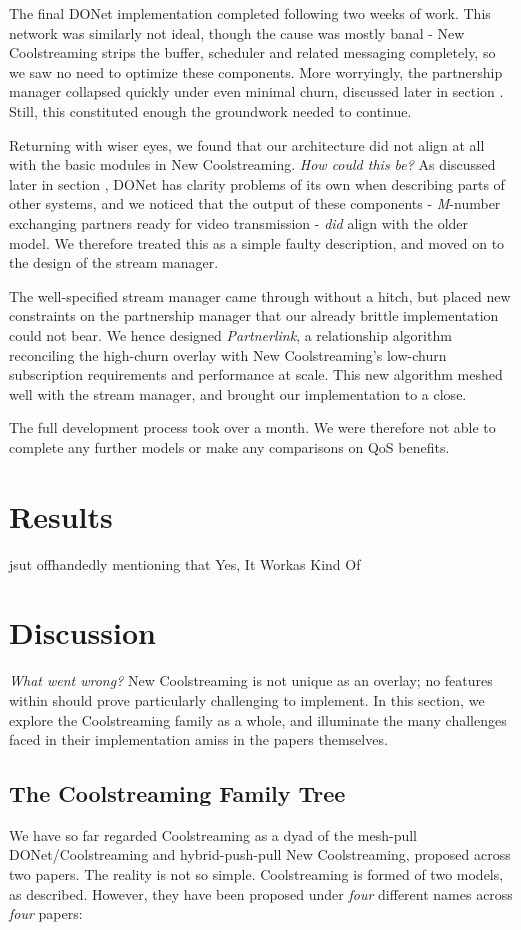 \documentclass[12pt,a4paper]{article}
\begin{document}
The final DONet implementation completed following two weeks of work. This network was similarly not ideal, though the cause was mostly banal - New Coolstreaming strips the buffer, scheduler and related messaging completely, so we saw no need to optimize these components. More worryingly, the partnership manager collapsed quickly under even minimal churn, discussed later in section . Still, this constituted enough the groundwork needed to continue.

Returning with wiser eyes, we found that our architecture did not align at all with the basic modules in New Coolstreaming. \textit{How could this be?} As discussed later in section , DONet has clarity problems of its own when describing parts of other systems, and we noticed that the output of these components - \textit{M}-number exchanging partners ready for video transmission - \textit{did} align with the older model. We therefore treated this as a simple faulty description, and moved on to the design of the stream manager.

The well-specified stream manager came through without a hitch, but placed new constraints on the partnership manager that our already brittle implementation could not bear. We hence designed \textit{Partnerlink}, a relationship algorithm reconciling the high-churn overlay with New Coolstreaming's low-churn subscription requirements and performance at scale. This new algorithm meshed well with the stream manager, and brought our implementation to a close.

The full development process took over a month. We were therefore not able to complete any further models or make any comparisons on QoS benefits.

\section{Results}
jsut offhandedly mentioning that Yes, It Workas Kind Of
\section{Discussion}
\textit{What went wrong?} New Coolstreaming is not unique as an overlay; no features within should prove particularly challenging to implement. In this section, we explore the Coolstreaming family as a whole, and illuminate the many challenges faced in their implementation amiss in the papers themselves.
\subsection{The Coolstreaming Family Tree}
We have so far regarded Coolstreaming as a dyad of the mesh-pull DONet/Coolstreaming and hybrid-push-pull New Coolstreaming, proposed across two papers. The reality is not so simple. Coolstreaming is formed of two models, as described. However, they have been proposed under \textit{four} different names across \textit{four} papers:
\end{document}
